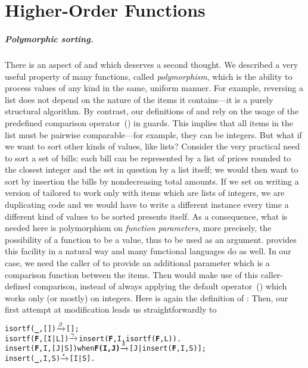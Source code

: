 
\chapter{Higher-Order Functions}
\label{chap:higher-order_functions}

\paragraph{Polymorphic sorting.}

There is an aspect of  and 
which deserves a second thought. We described 
a very useful property of many \Erlang functions, called
\emph{polymorphism}, which is the ability to process values of any
kind in the same, uniform manner. For example, reversing a list does
not depend on the nature of the items it contains---it is a purely
structural algorithm. By contrast, our definitions of
 and  rely on the usage of the
predefined comparison operator~(\erlcode{<}) in guards. This implies
that all items in the list must be pairwise comparable---for example,
they can be integers. But what if we want to sort other kinds of
values, like lists? Consider the very practical need to sort a set of
bills: each bill can be represented by a list of prices rounded to the
closest integer and the set in question by a list itself; we would
then want to sort by insertion the bills by nondecreasing total
amounts. If we set on writing a version of  tailored
to work only with items which are lists of integers, we are
duplicating code and we would have to write a different instance every
time a different kind of values to be sorted presents itself. As a
consequence, what is needed here is polymorphism on \emph{function
  parameters}, more precisely, the possibility of a function to be a
value, thus to be used as an argument. \Erlang provides this facility
in a natural way and many functional languages do as well. In our
case, we need the caller of  to provide an additional
parameter which is a comparison function between the items. Then
 would make use of this caller\hyp{}defined
comparison, instead of always applying the default
operator~(\erlcode{<}) which works only (or mostly) on integers. Here
is again the definition of : 
Then, our first attempt at modification leads us straightforwardly to
\begin{alltt}
isortf(\textbf{\_},   [])               \(\smashedrightarrow{\beta}\) [];
isortf(\textbf{F},[I|L])               \(\smashedrightarrow{\gamma}\) insert(\textbf{F},I,isortf(\textbf{F},L)).
insert(\textbf{F},I,[J|S]) when \textbf{F(I,J)} \(\smashedrightarrow{\delta}\) [J|insert(\textbf{F},I,S)];
insert(\textbf{\_},I,    S)             \(\smashedrightarrow{\epsilon}\) [I|S].
\end{alltt}
